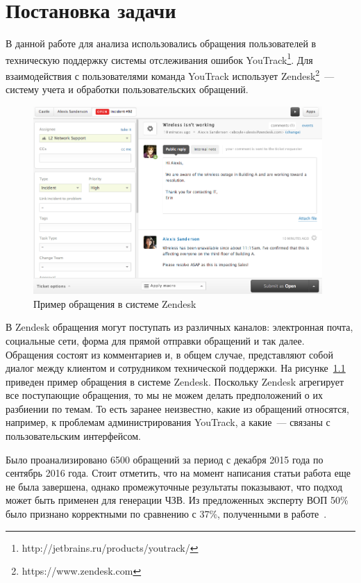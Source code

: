 \chapter{Постановка задачи}
\label{chap:task}

В данной работе для анализа использовались обращения пользователей в техническую поддержку системы отслеживания ошибок YouTrack\footnote{http://jetbrains.ru/products/youtrack/}. Для взаимодействия с пользователями команда YouTrack использует Zendesk\footnote{https://www.zendesk.com}~--- систему учета и обработки пользовательских обращений.

\begin{figure}[tph!]
\centerline{\includegraphics[width=11cm]{fig/zendesk2.png}}
    \caption{Пример обращения в системе Zendesk}
    \label{fig:zdesk_ticket}
\end{figure}

В Zendesk обращения могут поступать из различных каналов: электронная почта, социальные сети, форма для прямой отправки обращений и так далее. Обращения состоят из комментариев и, в общем случае, представляют собой диалог между клиентом и сотрудником технической поддержки. На рисунке~\ref{fig:zdesk_ticket} приведен пример обращения в системе Zendesk. Поскольку Zendesk агрегирует все поступающие  обращения, то мы не можем делать предположений о их разбиении по темам. То есть заранее неизвестно, какие из обращений относятся, например, к проблемам администрирования YouTrack, а какие~--- связаны с пользовательским интерфейсом.

Было проанализировано 6500 обращений за период с декабря 2015 года по сентябрь 2016 года. Стоит отметить, что на момент написания статьи работа еще не была завершена, однако промежуточные результаты показывают, что подход может быть применен для генерации ЧЗВ. Из предложенных эксперту ВОП 50\% было признано корректными по сравнению с 37\%, полученными в работе~\cite{original}.

